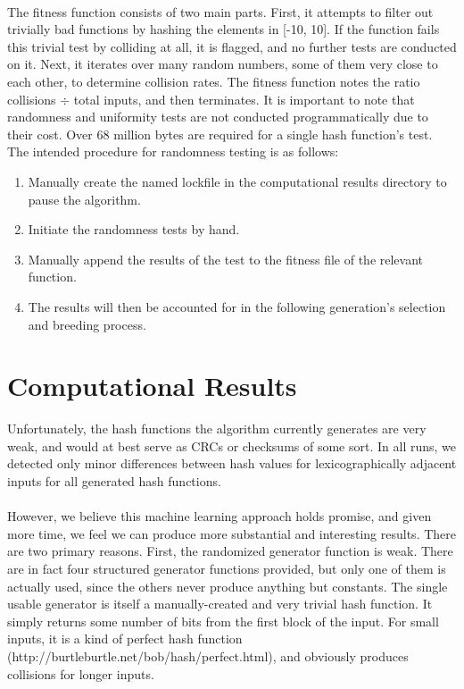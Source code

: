 \documentclass{article}
\begin{document}
\paragraph{}	
The fitness function consists of two main parts. First, it attempts to filter out trivially bad functions by hashing the elements in [-10, 10]. If the function fails this trivial test by colliding at all, it is flagged, and no further tests are conducted on it.
Next, it iterates over many random numbers, some of them very close to each other, to determine collision rates.
The fitness function notes the ratio collisions $\div$ total inputs, and then terminates.
It is important to note that randomness and uniformity tests are not conducted programmatically due to their cost. Over 68 million bytes are required for a single hash function's test. The intended procedure for randomness testing is as follows: 
\begin{enumerate}
\item Manually create the named lockfile in the computational results directory to pause the algorithm.
\item Initiate the randomness tests by hand.
\item Manually append the results of the test to the fitness file of the relevant function. 
\item The results will then be accounted for in the following generation's selection and breeding process.
\end{enumerate}

\section{Computational Results}
Unfortunately, the hash functions the algorithm currently generates are very weak, and would at best serve as CRCs or checksums of some sort. In all runs, we detected only minor differences between hash values for lexicographically adjacent inputs for all generated hash functions. 
\paragraph{}

However, we believe this machine learning approach holds promise, and given more time, we feel we can produce more substantial and interesting results. There are two primary reasons. First, the randomized generator function is weak. There are in fact four structured generator functions provided, but only one of them is actually used, since the others never produce anything but constants. The single usable generator is itself a manually-created and very trivial hash function. It simply returns some number of bits from the first block of the input. For small inputs, it is a kind of perfect hash function (http://burtleburtle.net/bob/hash/perfect.html), and obviously produces collisions for longer inputs.
\end{document}
